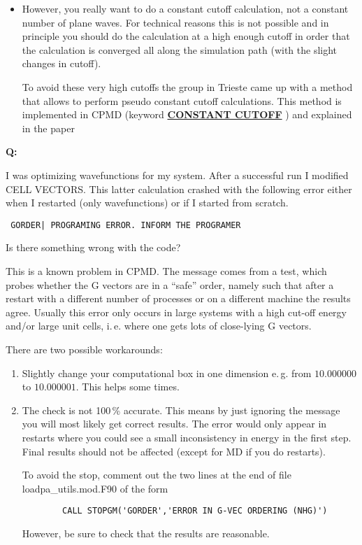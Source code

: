 \documentclass[twoside,10pt,titlepage,a4paper]{article}
\newcommand{\referto}[2]{\hyperlink{#1}{#2}}
\newcommand{\reflabel}[1]{\hypertarget{#1}}
\newcommand{\referto}[2]{\htmlref{#2}{#1}}
\newcommand{\reflabel}[1]{\label{#1}}
\newcommand{\faqquestion}[1]{\vspace{2ex}\reflabel{faq#1}{{\bf Q:\ }}}
\newcommand{\faqanswer}{\vspace{1ex}{{\bf A:\ }}}
\newcommand{\refkeyword}[1]{%
\referto{#1}{\textbf{#1}}%
\index{#1}%
}%
\begin{document}
\begin{itemize}
\item However, you really want to do a constant cutoff
   calculation, not a constant number of plane waves.
   For technical reasons this is not possible and in
   principle you should do the calculation at a high
   enough cutoff in order that the calculation is
   converged all along the simulation path (with the
   slight changes in cutoff).

   To avoid these very high cutoffs the group in Trieste
   came up with a method that allows to perform pseudo
   constant cutoff calculations.
   This method is implemented in CPMD
   (keyword \refkeyword{CONSTANT CUTOFF}) and explained
   in the paper~\cite{bernasconi95}
\end{itemize}

\faqquestion{gorder}
I was optimizing wavefunctions for my system. After a successful run I
modified CELL VECTORS. This latter calculation crashed with the
following error either when I restarted (only wavefunctions) or if I
started from scratch.
\begin{verbatim}
 GORDER| PROGRAMING ERROR. INFORM THE PROGRAMER
\end{verbatim}
Is there something wrong with the code?

\faqanswer
This is a known problem in CPMD.
The message comes from a test, which probes whether the G vectors are in a
``safe'' order, namely such that after a restart with a different number
of processes or on a different machine the results agree. Usually this
error only occurs in large systems with a high cut-off energy and/or
large unit cells, i.\,e. where one gets lots of close-lying G vectors.

There are two possible workarounds:
\begin{enumerate}
\item Slightly change your computational box in one dimension
   e.\,g. from $10.000000$ to $10.000001$.
   This helps some times.
\item
The check is not 100\,\% accurate.
This means by just ignoring the message you will
most likely get correct results. The error would
only appear in restarts where you could see a small
inconsistency in energy in the first step. Final
results should not be affected (except for MD if
you do restarts).

To avoid the stop, comment out the two lines
at the end of file loadpa\_utils.mod.F90 of the form
\begin{verbatim}
        CALL STOPGM('GORDER','ERROR IN G-VEC ORDERING (NHG)')
\end{verbatim}

However, be sure to check that the results are reasonable.
\end{enumerate}
\end{document}
